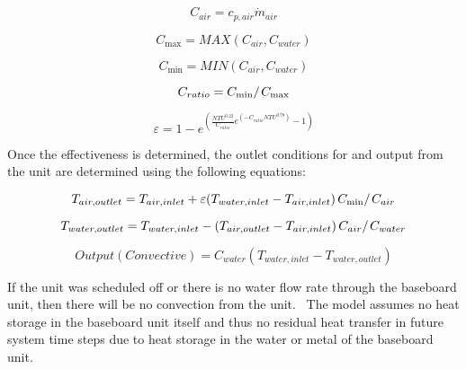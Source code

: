 \begin{equation}
{C_{air}} = {c_{p,air}}{\dot m_{air}}
\end{equation}

\begin{equation}
{C_{\max }} = MAX\left( {{C_{air}},{C_{water}}} \right)
\end{equation}

\begin{equation}
{C_{\min }} = MIN\left( {{C_{air}},{C_{water}}} \right)
\end{equation}

\begin{equation}
{C_{ratio}} = {{{C_{\min }}} \mathord{\left/ {\vphantom {{{C_{\min }}} {{C_{\max }}}}} \right. } {{C_{\max }}}}
\end{equation}

\begin{equation}
\varepsilon  = 1 - {e^{\left( {\frac{{NT{U^{0.22}}}}{{{C_{ratio}}}}{e^{\left( { - {C_{ratio}}NT{U^{0.78}}} \right)}} - 1} \right)}}
\end{equation}

Once the effectiveness is determined, the outlet conditions for and output from the unit are determined using the following equations:

\begin{equation}
{T_{air,outlet}} = {T_{air,inlet}} + \varepsilon {{\left( {{T_{water,inlet}} - {T_{air,inlet}}} \right){C_{\min }}} \mathord{\left/ {\vphantom {{\left( {{T_{water,inlet}} - {T_{air,inlet}}} \right){C_{\min }}} {{C_{air}}}}} \right. } {{C_{air}}}}
\end{equation}

\begin{equation}
{T_{water,outlet}} = {T_{water,inlet}} - \left( {{T_{air,outlet}} - {T_{air,inlet}}} \right){{{C_{air}}} \mathord{\left/ {\vphantom {{{C_{air}}} {{C_{water}}}}} \right. } {{C_{water}}}}
\end{equation}

\begin{equation}
Output\left( {Convective} \right) = {C_{water}}\left( {{T_{water,inlet}} - {T_{water,outlet}}} \right)
\end{equation}

If the unit was scheduled off or there is no water flow rate through the baseboard unit, then there will be no convection from the unit.~ The model assumes no heat storage in the baseboard unit itself and thus no residual heat transfer in future system time steps due to heat storage in the water or metal of the baseboard unit.

